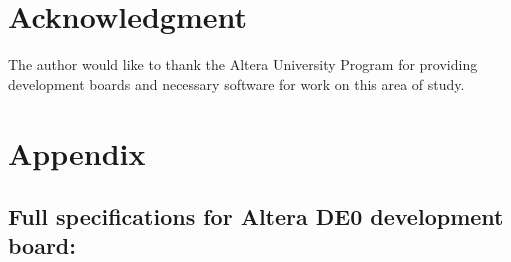 \documentclass[pdftex,10.5pt]{report}
\begin{document}
\section*{Acknowledgment}
The author would like to thank the Altera University Program \cite{UniProgram} for providing development boards and necessary software for work on this area of study.

\section{Appendix}

\label{App:AppendixA}
\subsection{Full specifications for Altera DE0 development board:}
\end{document}
